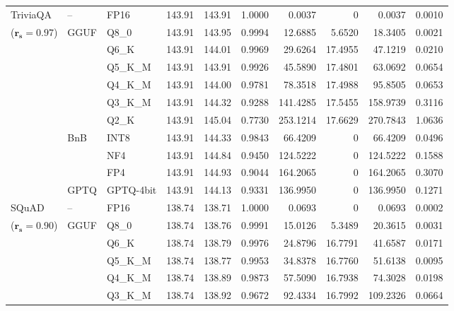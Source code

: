 \begin{longtable}{ll l rrrrrrr}
\midrule
TriviaQA & -- & FP16 & 143.91 & 143.91 & 1.0000 & 0.0037 & \cellcolor{cyan!12} $0$ & 0.0037 & 0.0010 \\
{\small ($\mathbf{r_s{=}0.97}$)} & GGUF & Q8\_0 & 143.91 & 143.95 & 0.9994 & 12.6885 & 5.6520 & 18.3405 & 0.0021 \\
 &  & Q6\_K & 143.91 & 144.01 & 0.9969 & 29.6264 & 17.4955 & 47.1219 & 0.0210 \\
 &  & Q5\_K\_M & 143.91 & 143.91 & 0.9926 & 45.5890 & 17.4801 & 63.0692 & 0.0654 \\
 &  & Q4\_K\_M & 143.91 & 144.00 & 0.9781 & 78.3518 & 17.4988 & 95.8505 & 0.0653 \\
 &  & Q3\_K\_M & 143.91 & 144.32 & \cellcolor{red!18} 0.9288 & \cellcolor{red!18} 141.4285 & 17.5455 & \cellcolor{red!18} 158.9739 & \cellcolor{red!18} 0.3116 \\
 &  & Q2\_K & 143.91 & 145.04 & \cellcolor{red!35} 0.7730 & \cellcolor{red!35} 253.1214 & 17.6629 & \cellcolor{red!35} 270.7843 & \cellcolor{red!35} 1.0636 \\
 & BnB & INT8 & 143.91 & 144.33 & 0.9843 & 66.4209 & \cellcolor{cyan!12} $0$ & 66.4209 & 0.0496 \\
 &  & NF4 & 143.91 & 144.84 & \cellcolor{red!18} 0.9450 & \cellcolor{red!18} 124.5222 & \cellcolor{cyan!12} $0$ & \cellcolor{red!18} 124.5222 & \cellcolor{red!18} 0.1588 \\
 &  & FP4 & 143.91 & 144.93 & \cellcolor{red!18} 0.9044 & \cellcolor{red!18} 164.2065 & \cellcolor{cyan!12} $0$ & \cellcolor{red!18} 164.2065 & \cellcolor{red!18} 0.3070 \\
 & GPTQ & GPTQ-4bit & 143.91 & 144.13 & \cellcolor{red!18} 0.9331 & \cellcolor{red!18} 136.9950 & \cellcolor{cyan!12} $0$ & \cellcolor{red!18} 136.9950 & \cellcolor{red!18} 0.1271 \\
\midrule
SQuAD & -- & FP16 & 138.74 & 138.71 & 1.0000 & 0.0693 & \cellcolor{cyan!12} $0$ & 0.0693 & 0.0002 \\
{\small ($\mathbf{r_s{=}0.90}$)} & GGUF & Q8\_0 & 138.74 & 138.76 & 0.9991 & 15.0126 & 5.3489 & 20.3615 & 0.0031 \\
 &  & Q6\_K & 138.74 & 138.79 & 0.9976 & 24.8796 & 16.7791 & 41.6587 & 0.0171 \\
 &  & Q5\_K\_M & 138.74 & 138.77 & 0.9953 & 34.8378 & 16.7760 & 51.6138 & 0.0095 \\
 &  & Q4\_K\_M & 138.74 & 138.89 & 0.9873 & 57.5090 & 16.7938 & 74.3028 & 0.0198 \\
 &  & Q3\_K\_M & 138.74 & 138.92 & 0.9672 & 92.4334 & 16.7992 & 109.2326 & 0.0664 \\

\end{longtable}
